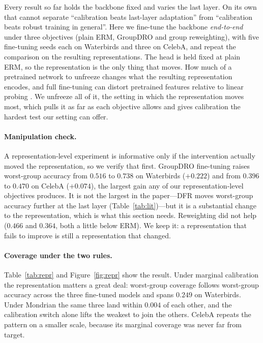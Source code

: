 \documentclass[pdflatex,sn-basic]{sn-jnl}%
\theoremstyle{thmstyleone}%
\begin{document}
Every result so far holds the backbone fixed and varies the last layer. On its own that
cannot separate ``calibration beats last-layer adaptation'' from ``calibration beats robust
training in general''. Here we fine-tune the backbone \emph{end-to-end} under three objectives
(plain ERM, GroupDRO and group reweighting), with five fine-tuning seeds each on Waterbirds and
three on CelebA, and repeat the comparison on the resulting representations. The head is held fixed at plain ERM, so the
representation is the only thing that moves. How much of a pretrained
network to unfreeze changes what the resulting representation encodes, and full
fine-tuning can distort pretrained features relative to linear probing
\citep{kumar2022finetuning,elmehdi2024unfreezing}. We unfreeze all of it, the setting in
which the representation moves most, which pulls it as far as each objective
allows and gives calibration the hardest test our setting can offer.

\paragraph{Manipulation check.} A representation-level experiment is informative only
if the intervention actually moved the representation, so we verify that first.
GroupDRO fine-tuning raises worst-group accuracy from $0.516$ to $0.738$ on
Waterbirds ($+0.222$) and from $0.396$ to $0.470$ on CelebA ($+0.074$), the largest
gain any of our representation-level objectives produces. It is not the largest in the paper---DFR
moves worst-group accuracy further at the last layer (Table~\ref{tab:lit})---but it is a
substantial change to the representation, which is what this section needs.
Reweighting did not help ($0.466$ and $0.364$, both a little below ERM). We keep it: a
representation that fails to improve is still a representation that changed.

\paragraph{Coverage under the two rules.} Table~\ref{tab:repr} and Figure~\ref{fig:repr} show the result. Under marginal calibration the
representation matters a great deal: worst-group coverage follows worst-group accuracy across the
three fine-tuned models and spans $0.249$ on Waterbirds. Under Mondrian the same three land within
$0.004$ of each other, and the calibration switch alone lifts the weakest to join the others. CelebA
repeats the pattern on a smaller scale, because its marginal coverage was never far from target.
\end{document}
